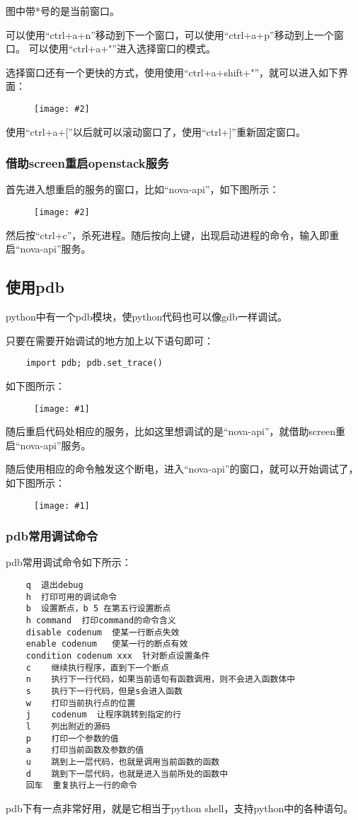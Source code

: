 \documentclass[a4paper,left=1.5cm,right=1.5cm,11pt]{article}
\newcommand{\fic}[1]{\begin{figure}[H]
		\center
		\texttt{[image: \#1]}
	\end{figure}}
\newcommand{\sizedfic}[2]{\begin{figure}[H]
		\center
		\texttt{[image: \#2]}
	\end{figure}}
\begin{document}
	图中带*号的是当前窗口。\par

	可以使用“ctrl+a+n”移动到下一个窗口，可以使用“ctrl+a+p”移动到上一个窗口。
	可以使用“ctrl+a+"”进入选择窗口的模式。\par

	选择窗口还有一个更快的方式，使用使用“ctrl+a+shift+"”，就可以进入如下界面：
	\sizedfic{0.9}{5.png}

	使用“ctrl+a+[”以后就可以滚动窗口了，使用“ctrl+]”重新固定窗口。\par

\subsubsection{借助screen重启openstack服务}
	首先进入想重启的服务的窗口，比如“nova-api”，如下图所示：
	\sizedfic{1}{6.png}

	然后按“ctrl+c”，杀死进程。随后按向上键，出现启动进程的命令，输入即重启“nova-api”服务。

\subsection{使用pdb}
	python中有一个pdb模块，使python代码也可以像gdb一样调试。\par

	只要在需要开始调试的地方加上以下语句即可：
	\begin{lstlisting}
	import pdb; pdb.set_trace()
	\end{lstlisting}

	如下图所示：
	\fic{7.png}

	随后重启代码处相应的服务，比如这里想调试的是“nova-api”，就借助screen重启“nova-api”服务。\par

	随后使用相应的命令触发这个断电，进入“nova-api”的窗口，就可以开始调试了，如下图所示：
	\fic{8.png}

\clearpage

\subsubsection{pdb常用调试命令}
	pdb常用调试命令如下所示：
	\begin{lstlisting}
	q  退出debug
	h  打印可用的调试命令
	b  设置断点，b 5 在第五行设置断点
	h command  打印command的命令含义
	disable codenum  使某一行断点失效
	enable codenum   使某一行的断点有效
	condition codenum xxx  针对断点设置条件
	c    继续执行程序，直到下一个断点
	n    执行下一行代码，如果当前语句有函数调用，则不会进入函数体中
	s    执行下一行代码，但是s会进入函数
	w    打印当前执行点的位置
	j    codenum  让程序跳转到指定的行
	l    列出附近的源码
	p    打印一个参数的值
	a    打印当前函数及参数的值
	u	 跳到上一层代码，也就是调用当前函数的函数
	d	 跳到下一层代码，也就是进入当前所处的函数中
	回车  重复执行上一行的命令
	\end{lstlisting}

	pdb下有一点非常好用，就是它相当于python shell，支持python中的各种语句。
	
\end{document}
